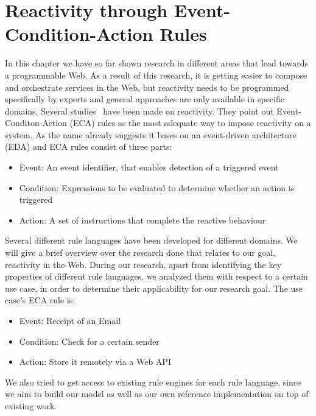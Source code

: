 \section{Reactivity through Event-Condition-Action Rules}
In this chapter we have so far shown research in different areas that lead towards a programmable Web.
As a result of this research, it is getting easier to compose and orchestrate services in the Web, but reactivity needs to be programmed specifically by experts and general approaches are only available in specific domains.
Several studies~\cite{2007_AlferesR3}\cite{2005-Bry_etal-XChange.pdf}\cite{10.1007-11896548_63}\cite{papamarkos2004rdftl}\cite{2012-Paschke_etal-ReactionRuleML.pdf} have been made on reactivity.
They point out Event-Conditon-Action (\textrm{ECA}) rules as the most adequate way to impose reactivity on a system.
As the name already suggests it bases on an event-driven architecture (\textrm{EDA}) and \textrm{ECA} rules consist of three parts:
\begin{itemize}
  \item Event: An event identifier, that enables detection of a triggered event
  \item Condition: Expressions to be evaluated to determine whether an action is triggered
  \item Action: A set of instructions that complete the reactive behaviour
\end{itemize}

Several different rule languages have been developed for different domains.
We will give a brief overview over the research done that relates to our goal, reactivity in the Web.
During our research, apart from identifying the key properties of different rule languages, we analyzed them with respect to a certain use case, in order to determine their applicability for our research goal.
The use case's ECA rule is:
\begin{itemize}
  \item Event: Receipt of an Email%
  \item Condition: Check for a certain sender
  \item Action: Store it remotely via a Web API
\end{itemize}
We also tried to get access to existing rule engines for each rule language, since we aim to build our model as well as our own reference implementation on top of existing work.


